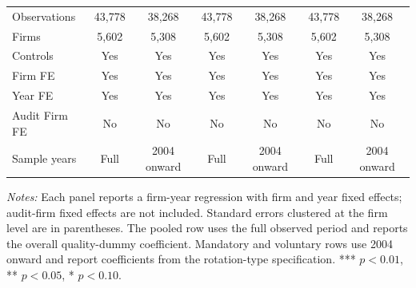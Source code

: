 \documentclass[10pt]{article}
\begin{document}
\begin{minipage}{19cm}
\begin{threeparttable}
\begin{tabular}{l cc cc cc}
Observations & 43,778 & 38,268 & 43,778 & 38,268 & 43,778 & 38,268 \\
Firms & 5,602 & 5,308 & 5,602 & 5,308 & 5,602 & 5,308 \\
\midrule
Controls & Yes & Yes & Yes & Yes & Yes & Yes \\
Firm FE & Yes & Yes & Yes & Yes & Yes & Yes \\
Year FE & Yes & Yes & Yes & Yes & Yes & Yes \\
Audit Firm FE & No & No & No & No & No & No \\
Sample years & Full & 2004 onward & Full & 2004 onward & Full & 2004 onward \\
\bottomrule
\end{tabular}
\begin{tablenotes}\fontsize{9}{11}\selectfont
\item \fontsize{9}{11}\selectfont \textit{Notes:} Each panel reports a firm-year regression with firm and year fixed effects; audit-firm fixed effects are not included. Standard errors clustered at the firm level are in parentheses. The pooled row uses the full observed period and reports the overall quality-dummy coefficient. Mandatory and voluntary rows use 2004 onward and report coefficients from the rotation-type specification. *** \(p<0.01\), ** \(p<0.05\), * \(p<0.10\).
\end{tablenotes}
\end{threeparttable}

\end{minipage}
\end{document}
